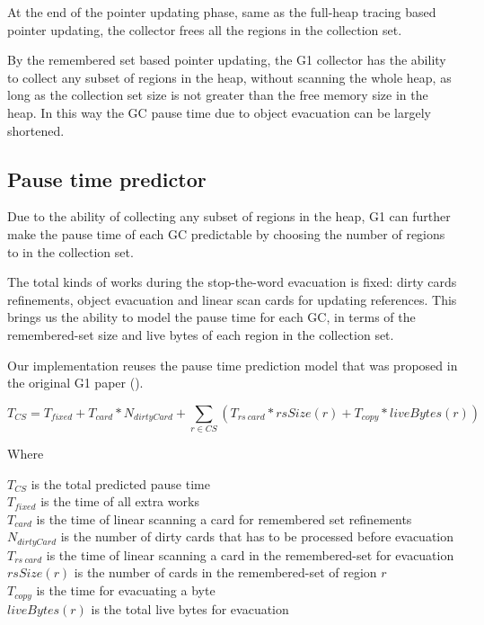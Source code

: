 At the end of the pointer updating phase, same as the full-heap tracing based
pointer updating, the collector frees all the regions in the collection set.

By the remembered set based pointer updating, the G1 collector has the ability to collect
any subset of regions in the heap, without scanning the whole heap, as long as the collection set size is not greater
than the free memory size in the heap. In this way the GC pause time due to object evacuation
can be largely shortened.

\subsection{Pause time predictor}

Due to the ability of collecting any subset of regions in the heap, G1 can further
make the pause time of each GC predictable by choosing the number of regions to in the collection set.

The total kinds of works during the stop-the-word evacuation is fixed:
dirty cards refinements, object evacuation and linear scan cards for updating references.
This brings us the ability to model the pause time for each GC, in terms of the remembered-set
size and live bytes of each region in the collection set.

Our implementation reuses the pause time prediction model that was proposed in the
original G1 paper (\cite{detlefs2004garbage}).

$$
T_{CS} = T_{fixed} + T_{card} * N_{dirtyCard} + \sum_{r\in CS} (T_{rs\ card} * rsSize(r) + T_{copy} * liveBytes(r))
$$

\noindent Where

\noindent$T_{CS}$ is the total predicted pause time\\
$T_{fixed}$ is the time of all extra works\\
$T_{card}$ is the time of linear scanning a card for remembered set refinements\\
$N_{dirtyCard}$ is the number of dirty cards that has to be processed before evacuation\\
$T_{rs\ card}$ is the time of linear scanning a card in the remembered-set for evacuation\\
$rsSize(r)$ is the number of cards in the remembered-set of region $r$\\
$T_{copy}$ is the time for evacuating a byte\\
$liveBytes(r)$ is the total live bytes for evacuation\\

